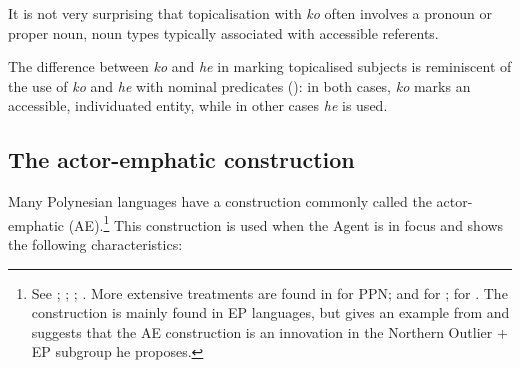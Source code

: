 It is not very surprising that topicalisation with \textit{ko} often involves a pronoun or proper noun, noun types typically associated with accessible referents.

The difference between \textit{ko} and \textit{he} in marking topicalised subjects is reminiscent of the use of \textit{ko} and \textit{he} with nominal predicates (): in both cases, \textit{ko} marks an accessible, individuated entity, while in other cases \textit{he} is used.

\subsection{The actor-emphatic construction}\label{sec:8.6.3}
Many Polynesian languages have a construction commonly called the actor-emphatic (AE).\footnote{\label{fn:428}See \citet[196–197]{Harlow2001}; \citet[175–176]{Harlow2007Maori}; \citet[147–148]{ElbertPukui1979}; \citet[62–63]{LazardPeltzer2000}. More extensive treatments are found in \citet[111–123]{Clark1976} for PPN; \citet{Waite1990} and \citet{Bauer2004} for ; \citet{PotsdamPolinsky2012} for . The construction is mainly found in EP languages, but \citet[315]{Wilson2012} gives an example from  and suggests that the AE construction is an innovation in the Northern Outlier + EP subgroup he proposes.} This construction is used when the Agent is in focus and shows the following characteristics:

